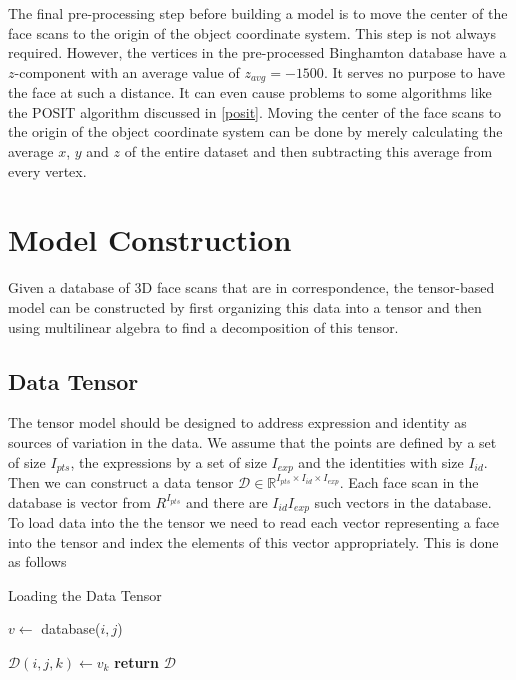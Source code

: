\documentclass[11pt,a4paper]{report}
\begin{document}
The final pre-processing step before building a model is to move the center of the
face scans to the origin of the object coordinate system. This step is not always required. However, the vertices in the
pre-processed Binghamton database have a $z$-component with an average value of
$z_{avg}=-1500$. It serves no purpose to have the face at such a distance. It
can even cause problems to some algorithms like the POSIT algorithm discussed in
\ref{posit}. Moving the center of the face scans to the origin of the object coordinate
system can be done by merely calculating the average $x$, $y$ and $z$ of the
entire dataset and then subtracting this average from every vertex.


\section{Model Construction}
Given a database of 3D face scans that are in correspondence, the tensor-based
model can be constructed by first organizing this data into a tensor and
then using multilinear algebra to find a decomposition of this tensor.

\subsection{Data Tensor}\label{s:datatesnor}
The tensor model should be designed to address expression and identity as sources of variation in
the data. We assume that the points are defined by a set of size $I_{pts}$, the
expressions by a set of size $I_{exp}$ and the identities with size $I_{id}$. Then we can
construct a data tensor $\mathcal{D} \in \mathbb{R}^{I_{pts} \times I_{id}
  \times I_{exp}}$. Each face scan in the database is vector from
$R^{I_{pts}}$ and there are $I_{id}I_{exp}$ such vectors in the database. To load data into the the tensor we need to read each vector
representing a face into the tensor and index the elements of this vector
appropriately. This is done as follows

\begin{algorithm}\label{a:load}
\caption{Loading the Data Tensor}
\begin{algorithmic}[1]
 

\State $v \gets $ database($i,j$)


\State $\mathcal{D}(i,j,k) \gets v_k $
\EndFor
\EndFor
\EndFor
\State \textbf{return} $\mathcal{D}$ 
\EndProcedure
\end{algorithmic}
\end{algorithm}
\end{document}
